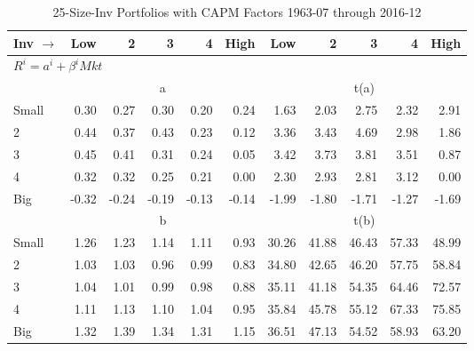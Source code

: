 
\begin{table}[!ht]
\centering
\caption{25-Size-Inv Portfolios with CAPM Factors 1963-07 through 2016-12}
\begin{tabular}{lrrrrrrrrrr}
  \toprule
    Inv $\rightarrow$ & Low & 2 & 3 & 4 & High & Low & 2 & 3 & 4 & High \\ 
  \midrule
  \multicolumn{11}{l}{$R^i=a^i+\beta^iMkt$} \\

  
    
      & \multicolumn{5}{c}{a} & \multicolumn{5}{c}{t(a)}
    
    \\
      \cmidrule(r){2-6} \cmidrule(r){7-11}

    Small   & 0.30  & 0.27  & 0.30  & 0.20  & 0.24  & 1.63  & 2.03  & 2.75  & 2.32  & 2.91  \\
         2  & 0.44  & 0.37  & 0.43  & 0.23  & 0.12  & 3.36  & 3.43  & 4.69  & 2.98  & 1.86  \\
         3  & 0.45  & 0.41  & 0.31  & 0.24  & 0.05  & 3.42  & 3.73  & 3.81  & 3.51  & 0.87  \\
         4  & 0.32  & 0.32  & 0.25  & 0.21  & 0.00  & 2.30  & 2.93  & 2.81  & 3.12  & 0.00  \\
    Big     & -0.32  & -0.24  & -0.19  & -0.13  & -0.14  & -1.99  & -1.80  & -1.71  & -1.27  & -1.69  \\

  
    
      & \multicolumn{5}{c}{b} & \multicolumn{5}{c}{t(b)}
    
    \\
      \cmidrule(r){2-6} \cmidrule(r){7-11}

    Small   & 1.26  & 1.23  & 1.14  & 1.11  & 0.93  & 30.26  & 41.88  & 46.43  & 57.33  & 48.99  \\
         2  & 1.03  & 1.03  & 0.96  & 0.99  & 0.83  & 34.80  & 42.65  & 46.20  & 57.75  & 58.84  \\
         3  & 1.04  & 1.01  & 0.99  & 0.98  & 0.88  & 35.11  & 41.18  & 54.35  & 64.46  & 72.57  \\
         4  & 1.11  & 1.13  & 1.10  & 1.04  & 0.95  & 35.84  & 45.78  & 55.12  & 67.33  & 75.85  \\
    Big     & 1.32  & 1.39  & 1.34  & 1.31  & 1.15  & 36.51  & 47.13  & 54.52  & 58.93  & 63.20  \\

  

  \bottomrule
\end{tabular}
\label{tbl:25_Size_Inv_CAPM}
\end{table}